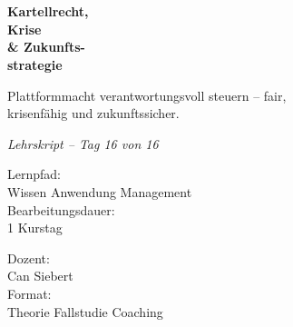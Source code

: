 \documentclass[11pt,a4paper,oneside]{article}
\newcommand{\caveatfontfallback}{\itshape}
\newcommand\caveatfont{\caveatfontfallback}%
\begin{document}
\begin{titlepage}
  \pagestyle{empty}
  \vspace*{1.5cm}
  \\[2pt]
  \noindent{\color{lpAccent}\rule{\linewidth}{1.2pt}}\\[4pt]

  \vspace{3cm}
  {\sffamily\fontsize{30}{34}\selectfont\bfseries\color{lpInk}Kartellrecht,\\Krise\\\& Zukunfts-\\strategie\par}

  \vspace{0.7cm}
  {\sffamily\large\color{lpGray}Plattformmacht verantwortungsvoll steuern -- fair,\\krisenfähig und zukunftssicher.\par}

  \vspace{1.5cm}
  {\caveatfont\LARGE\color{lpAmber}Lehrskript -- Tag 16 von 16}\par

  \vfill

  \noindent\begin{minipage}{0.55\linewidth}
    {\sffamily\footnotesize\color{lpGray}Lernpfad:}\\
    {\sffamily\small\color{lpInk}Wissen \textrightarrow{} Anwendung \textrightarrow{} Management}\\[10pt]
    {\sffamily\footnotesize\color{lpGray}Bearbeitungsdauer:}\\
    {\sffamily\small\color{lpInk}1 Kurstag}
  \end{minipage}\hfill
  \begin{minipage}{0.4\linewidth}
    \raggedleft
    {\sffamily\footnotesize\color{lpGray}Dozent:}\\
    {\sffamily\small\color{lpInk}Can Siebert}\\[10pt]
    {\sffamily\footnotesize\color{lpGray}Format:}\\
    {\sffamily\small\color{lpInk}Theorie \textperiodcentered{} Fallstudie \textperiodcentered{} Coaching}
  \end{minipage}

  \vspace{0.5cm}
  \noindent{\color{lpAccent}\rule{\linewidth}{0.6pt}}
\end{titlepage}
\end{document}
